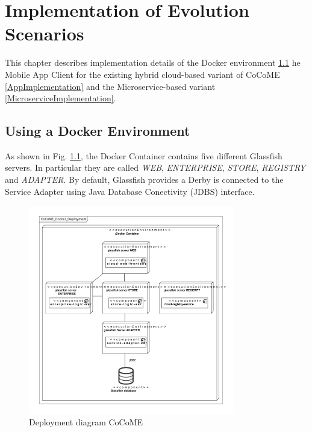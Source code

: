 \chapter{Implementation of Evolution Scenarios}
\label{c:implementation}
This chapter describes implementation details of the Docker environment \ref{DockerImplementation}\deleted{,} 
he Mobile App Client for the existing hybrid cloud-based variant of CoCoME \deleted{(}\ref{AppImplementation}\deleted{)} and the Microservice-based variant \deleted{(}\ref{MicroserviceImplementation}\deleted{)}.


\section{Using a Docker Environment}\label{DockerImplementation}
 	As shown in Fig. \ref*{Deploym_CoCoME}, the Docker Container contains five different Glassfish servers. In particular they are called \textit{WEB}, \textit{ENTERPRISE}, \textit{STORE}, \textit{REGISTRY} and \textit{ADAPTER}. 
 	By default, Glassfish provides a Derby 
 	 is connected to the Service Adapter using  Java Database Conectivity (JDBS) interface.
 	\begin{figure}[h]
 		\centering
 		\includegraphics[width = 0.8\textwidth]{img/docker_Container_Deployment.pdf}
 		\caption{Deployment diagram CoCoME}
 		\label{Deploym_CoCoME}
 	\end{figure}
